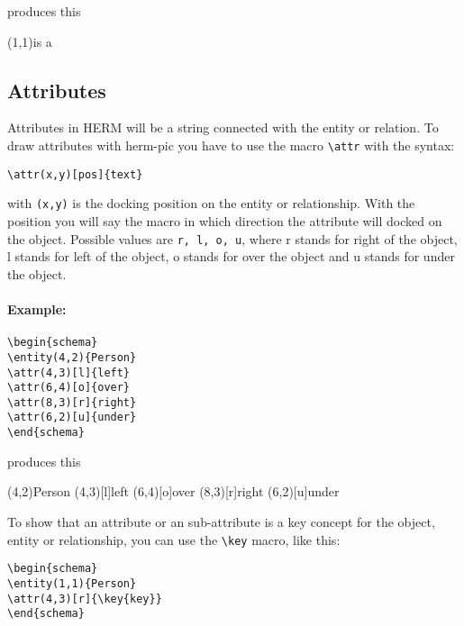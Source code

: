 \documentclass[a4paper,11pt]{article}
\begin{document}
produces this

\begin{schema}
\relation(1,1){is a}
\end{schema}

\subsection{Attributes}

Attributes in HERM will be a string connected with the entity or relation.
To draw attributes with herm-pic you have to use the macro \verb|\attr| with the syntax:

\begin{verbatim}
\attr(x,y)[pos]{text}
\end{verbatim}

with {\tt (x,y)} is the docking position on the entity or relationship. With the
position you will say the macro in which direction the attribute will docked on
the object. Possible values are {\tt r, l, o, u}, where r stands for right of the object,
l stands for left of the object, o stands for over the object and u stands for under the object.

\paragraph{Example:}

\begin{verbatim}
\begin{schema}
\entity(4,2){Person}
\attr(4,3)[l]{left}
\attr(6,4)[o]{over}
\attr(8,3)[r]{right}
\attr(6,2)[u]{under}
\end{schema}
\end{verbatim}

produces this

\begin{schema}
\entity(4,2){Person}
\attr(4,3)[l]{left}
\attr(6,4)[o]{over}
\attr(8,3)[r]{right}
\attr(6,2)[u]{under}
\end{schema}

To show that an attribute or an sub-attribute is a key concept for the object, entity or relationship,
you can use the \verb|\key| macro, like this:

\begin{verbatim}
\begin{schema}
\entity(1,1){Person}
\attr(4,3)[r]{\key{key}}
\end{schema}
\end{verbatim}
\end{document}
